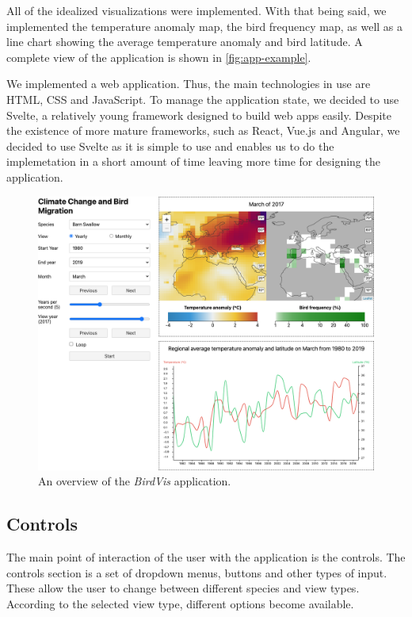 \documentclass[journal]{vgtc}                %
\begin{document}
All of the idealized visualizations were implemented. With that being said, we implemented the temperature anomaly map, the bird frequency map, as well as a line chart showing the average temperature anomaly and bird latitude. A complete view of the application is shown in \autoref{fig:app-example}.

We implemented a web application. Thus, the main technologies in use are HTML, CSS and JavaScript. To manage the application state, we decided to use Svelte\cite{svelte}, a relatively young framework designed to build web apps easily. Despite the existence of more mature frameworks, such as React, Vue.js and Angular, we decided to use Svelte as it is simple to use and enables us to do the implemetation in a short amount of time leaving more time for designing the application.

\begin{figure}[t]
  \centering
  \includegraphics[width=\linewidth]{app-example.png}
  \caption{An overview of the \emph{BirdVis} application.}
  \label{fig:app-example}
\end{figure}

\subsection{Controls}

The main point of interaction of the user with the application is the controls. The controls section is a set of dropdown menus, buttons and other types of input. These allow the user to change between different species and view types. According to the selected view type, different options become available.
\end{document}

